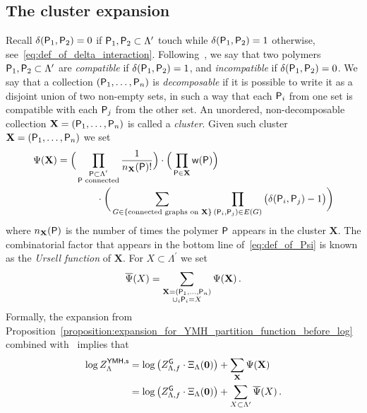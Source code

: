\documentclass[11pt]{article}
\theoremstyle{definition}
\theoremstyle{remark}
\numberwithin{theorem}{section}
\def\La{{\Lambda}}
\begin{document}
    \subsection{The cluster expansion}
    Recall $\delta({\sf P}_1,{\sf P}_2) = 0$ if ${\sf P}_1,{\sf P}_2\subset \La^\prime$ touch while $\delta({\sf P}_1,{\sf P}_2)= 1$ otherwise, see~\eqref{eq:def_of_delta_interaction}. Following~\cite{Friedli-Velenik_book}, we say that two polymers ${\sf P}_1,{\sf P}_2\subset \La^\prime$ are \emph{compatible} if $\delta({\sf P}_1,{\sf P}_2) = 1$, and \emph{incompatible} if $\delta({\sf P}_1,{\sf P}_2) = 0$. We say that a collection $({\sf P}_1,\ldots,{\sf P}_n)$ is \emph{decomposable} if it is possible to write it as a disjoint union of two non-empty sets, in such a way that each ${\sf P}_i$ from one set is compatible with each ${\sf P}_j$ from the other set. An unordered, non-decomposable collection $\mathbf{X} = ({\sf P}_1,\ldots,{\sf P}_n)$ is called a \emph{cluster}. Given such cluster $\mathbf{X} = ({\sf P}_1,\ldots,{\sf P}_n)$ we set
    \begin{align}\label{eq:def_of_Psi}
        \Psi(\mathbf{X}) &=  \Big(\prod_{\substack{{\sf P}\subset \La^\prime \\ {\sf P} \text{ connected}}} \frac{1}{n_{\mathbf{X}}({\sf P})!} \Big) \cdot \Big( \prod_{{\sf P}\in \mathbf{X}} {\sf w}({\sf P}) \Big) \notag \\ 
        &\qquad \qquad \cdot \bigg(\sum_{G\in \{\text{connected graphs on } \mathbf{X}\}} \prod_{({\sf P}_i,{\sf P}_j)\in E(G)} \big(\delta({\sf P}_i,{\sf P}_j) - 1\big)\bigg) 
    \end{align}
    where $n_{\mathbf{X}}({\sf P})$ is the number of times the polymer ${\sf P}$ appears in the cluster $\mathbf{X}$. The combinatorial factor that appears in the bottom line of~\eqref{eq:def_of_Psi} is known as the \emph{Ursell function} of $\mathbf{X}$. For $X\subset \La^\prime$ we set 
    \begin{equation} \label{eq:def_of_psi_overline}
        \overline{\Psi}(X) = \sum_{\substack{\mathbf{X}= ({\sf P}_1,\ldots,{\sf P}_n) \\ \cup_i {\sf P}_i = X}} \Psi(\mathbf{X}) \, .
    \end{equation}
    Formally, the expansion from Proposition~\ref{proposition:expansion_for_YMH_partition_function_before_log} combined with~\cite[Proposition~5.3]{Friedli-Velenik_book} implies that
    \begin{align}
    \label{eq:cluster_expansion_for_log_YMH_partition_function} \nonumber
        \log Z_{\Lambda}^{{\sf YMH,s}} & = \log \big(Z_{\Lambda,f}^{{\sf G}}\cdot \Xi_{\Lambda} (\mathbf{0})\big) + \sum_{\mathbf{X}} \Psi(\mathbf{X}) \\ & = \log \big(Z_{\Lambda,f}^{{\sf G}}\cdot \Xi_{\Lambda} (\mathbf{0})\big) + \sum_{X\subset \La^\prime} \overline \Psi(X) \, .
    \end{align}
\end{document}
